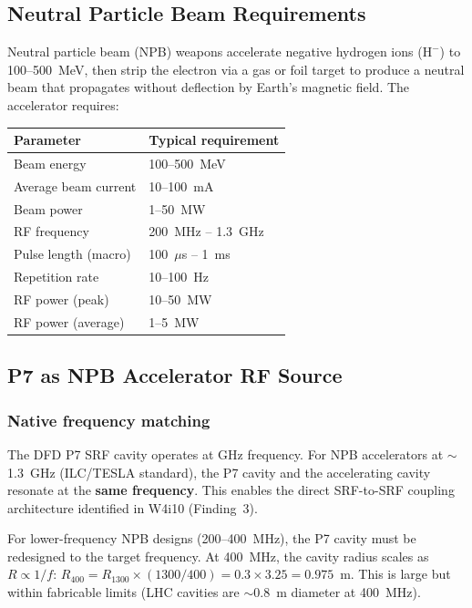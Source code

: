 \documentclass[11pt]{article}
\begin{document}
\subsection{Neutral Particle Beam Requirements}

Neutral particle beam (NPB) weapons accelerate negative hydrogen ions
($\text{H}^-$) to 100--500~MeV, then strip the electron via a gas or
foil target to produce a neutral beam that propagates without deflection
by Earth's magnetic field. The accelerator requires:

\begin{center}
\begin{tabular}{ll}
\toprule
Parameter & Typical requirement \\
\midrule
Beam energy & 100--500~MeV \\
Average beam current & 10--100~mA \\
Beam power & 1--50~MW \\
RF frequency & 200~MHz -- 1.3~GHz \\
Pulse length (macro) & 100~$\mu$s -- 1~ms \\
Repetition rate & 10--100~Hz \\
RF power (peak) & 10--50~MW \\
RF power (average) & 1--5~MW \\
\bottomrule
\end{tabular}
\end{center}

\subsection{P7 as NPB Accelerator RF Source}

\subsubsection{Native frequency matching}

The DFD P7 SRF cavity operates at GHz frequency. For NPB accelerators
at $\sim$1.3~GHz (ILC/TESLA standard), the P7 cavity and the accelerating
cavity resonate at the \textbf{same frequency}. This enables the direct
SRF-to-SRF coupling architecture identified in W4i10 (Finding~3).

For lower-frequency NPB designs (200--400~MHz), the P7 cavity must be
redesigned to the target frequency. At 400~MHz, the cavity radius scales
as $R \propto 1/f$: $R_{400} = R_{1300} \times (1300/400) = 0.3 \times 3.25
= 0.975$~m. This is large but within fabricable limits (LHC cavities are
$\sim$0.8~m diameter at 400~MHz).
\end{document}

